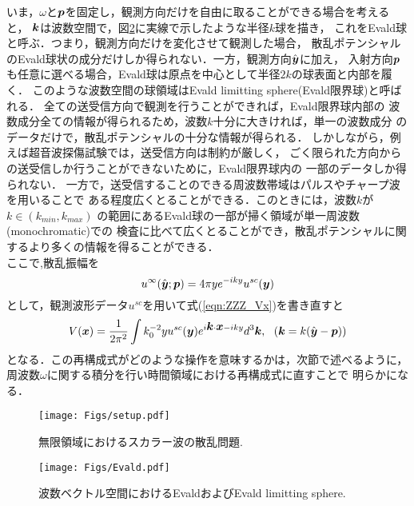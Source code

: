 いま，$\omega$と$\mbox{\boldmath $p$}$を固定し，観測方向だけを自由に取ることができる場合を考えると，
$\mbox{\boldmath $k$}$は波数空間で，図\ref{fig:ZZZ_Evald}に実線で示したような半径$k$球を描き，
これをEvald球と呼ぶ．つまり，観測方向だけを変化させて観測した場合，
散乱ポテンシャルのEvald球状の成分だけしか得られない．一方，観測方向$\hat{\mbox{\boldmath $y$}}$に加え，
入射方向$\mbox{\boldmath $p$}$も任意に選べる場合，Evald球は原点を中心として半径$2k$の球表面と内部を履く．
このような波数空間の球領域はEvald limitting sphere(Evald限界球)と呼ばれる．
全ての送受信方向で観測を行うことができれば，Evald限界球内部の
波数成分全ての情報が得られるため，波数$k$十分に大きければ，単一の波数成分
のデータだけで，散乱ポテンシャルの十分な情報が得られる．
しかしながら，例えば超音波探傷試験では，送受信方向は制約が厳しく，
ごく限られた方向からの送受信しか行うことができないために，Evald限界球内の
一部のデータしか得られない．
一方で，送受信することのできる周波数帯域はパルスやチャープ波を用いることで
ある程度広くとることができる．このときには，波数$k$が$k\in \left(k_{min},k_{max} \right)$
の範囲にあるEvald球の一部が掃く領域が単一周波数(monochromatic)での
検査に比べて広くとることができ，散乱ポテンシャルに関するより多くの情報を得ることができる．
\\

ここで,散乱振幅を
\begin{equation}
	u^{\infty}(\hat{\mbox{\boldmath $y$}};\mbox{\boldmath $p$})=4\pi ye^{-iky} u^{sc}(\mbox{\boldmath $y$})
	\label{eqn:ZZZ_21}
\end{equation}
として，観測波形データ$u^{sc}$を用いて式(\ref{eqn:ZZZ_Vx})を書き直すと
\begin{equation}
	V(\mbox{\boldmath $x$}) =\frac{1}{2\pi^2} \int k_0^{-2} yu^{sc}(\mbox{\boldmath $y$})
	e^{i\mbox{\boldmath $k$}\cdot \mbox{\boldmath $x$}-iky}d^3\mbox{\boldmath $k$}, 
	\ \ (\mbox{\boldmath $k$}=k(\hat{\mbox{\boldmath $y$}}-\mbox{\boldmath $p$}))
	\label{eqn:ZZZ_Vx_usc}
\end{equation}
となる．この再構成式がどのような操作を意味するかは，次節で述べるように，
周波数$\omega$に関する積分を行い時間領域における再構成式に直すことで
明らかになる．
\begin{figure}[h]
	\begin{center}
	\texttt{[image: Figs/setup.pdf]} 
	\end{center}
	\caption{無限領域におけるスカラー波の散乱問題.} 
	\label{fig:ZZZ_100}
\end{figure}
\begin{figure}[h]
	\begin{center}
	\texttt{[image: Figs/Evald.pdf]} 
	\end{center}
	\caption{波数ベクトル空間におけるEvaldおよびEvald limitting sphere.} 
	\label{fig:ZZZ_Evald}
\end{figure}
